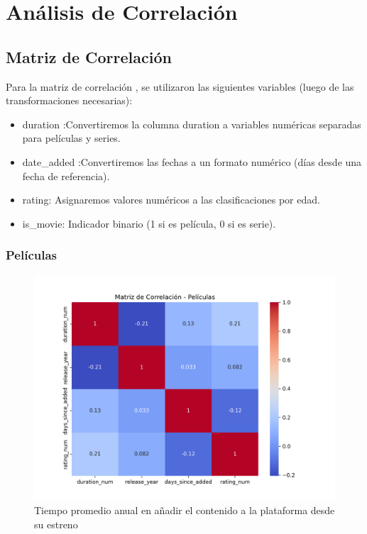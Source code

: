 \documentclass{article}
\begin{document}
\section{Análisis de Correlación}
\subsection{Matriz de Correlación}
Para la matriz de correlación , se utilizaron las siguientes variables (luego de las transformaciones necesarias):
\begin{itemize}
	\item duration :Convertiremos la columna duration a variables numéricas separadas para películas y series.
	\item date\_added :Convertiremos las fechas a un formato numérico (días desde una fecha de referencia).
	\item rating: Asignaremos valores numéricos a las clasificaciones por edad.
	\item is\_movie: Indicador binario (1 si es película, 0 si es serie).
\end{itemize}

\subsubsection{Películas}
\begin{figure}[H]
	\centering
	\includegraphics[width=\textwidth]{Graphs/matriz_correlacion_peliculas.png}
	\caption{Tiempo promedio anual en añadir el contenido a la plataforma desde su estreno }
	\label{fig:matriz_correlacion_peliculas}
\end{figure}
\end{document}
